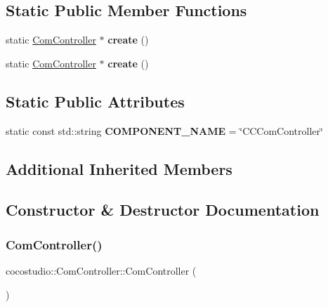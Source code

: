 \subsection*{Static Public Member Functions}
\begin{DoxyCompactItemize}
\item 
\mbox{\label{classcocostudio_1_1ComController_a0d53b4a132043bf30350b3d2efb4d0b3}} 
static \hyperlink{classcocostudio_1_1ComController}{Com\+Controller} $\ast$ {\bfseries create} ()
\item 
\mbox{\label{classcocostudio_1_1ComController_a120b672c42001ffd1d63cec1652c206b}} 
static \hyperlink{classcocostudio_1_1ComController}{Com\+Controller} $\ast$ {\bfseries create} ()
\end{DoxyCompactItemize}
\subsection*{Static Public Attributes}
\begin{DoxyCompactItemize}
\item 
\mbox{\label{classcocostudio_1_1ComController_a38aaa7d1896e39d67ea3761a909c13a0}} 
static const std\+::string {\bfseries C\+O\+M\+P\+O\+N\+E\+N\+T\+\_\+\+N\+A\+ME} = \char`\"{}C\+C\+Com\+Controller\char`\"{}
\end{DoxyCompactItemize}
\subsection*{Additional Inherited Members}


\subsection{Constructor \& Destructor Documentation}
\mbox{\label{classcocostudio_1_1ComController_a7ab7a1d39f1ca8cc381665b133843a47}} 
\subsubsection{\texorpdfstring{Com\+Controller()}{ComController()}\hspace{0.1cm}{\footnotesize\ttfamily [1/2]}}
{\footnotesize\ttfamily cocostudio\+::\+Com\+Controller\+::\+Com\+Controller (\begin{DoxyParamCaption}{ }\end{DoxyParamCaption})}


